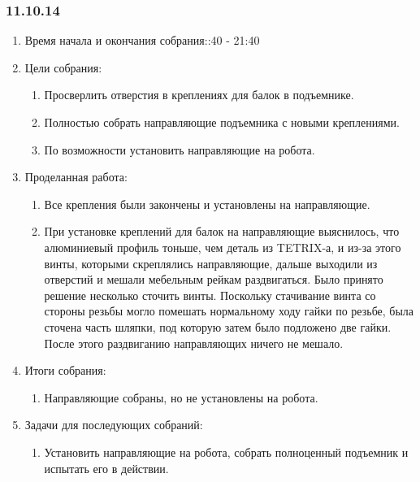 
\subsubsection{11.10.14}

\begin{enumerate}
	\item Время начала и окончания собрания::40 - 21:40
	\item Цели собрания:\newline
	\begin{enumerate}
	  \item Просверлить отверстия в креплениях для балок в подъемнике.\newline
	  
	  \item Полностью собрать направляющие подъемника с новыми креплениями.\newline
	  
	  \item По возможности установить направляющие на робота.\newline
	  
    \end{enumerate}
	\item Проделанная работа:\newline
	\begin{enumerate}
	  \item Все крепления были закончены и установлены на направляющие.\newline
      
      \item  При установке креплений для балок на направляющие выяснилось, что алюминиевый профиль тоньше, чем деталь из TETRIX-а, и из-за этого винты, которыми скреплялись направляющие, дальше выходили из отверстий и мешали мебельным рейкам раздвигаться. Было принято решение несколько сточить винты. Поскольку стачивание винта со стороны резьбы могло помешать нормальному ходу гайки по резьбе, была сточена часть шляпки, под которую затем было подложено две гайки. После этого раздвиганию направляющих ничего не мешало.\newline
      
    \end{enumerate}
    
	\item Итоги собрания: \newline
	\begin{enumerate}
	  \item Направляющие собраны, но не установлены на робота.\newline

    \end{enumerate}
    
	\item Задачи для последующих собраний:\newline
	\begin{enumerate}
	  \item Установить направляющие на робота, собрать полноценный подъемник и испытать его в действии.\newline
	  
    \end{enumerate}     
\end{enumerate}

\fillpage
